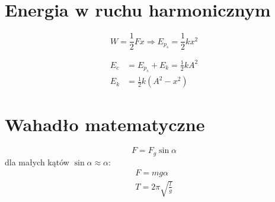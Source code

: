 \section{Energia w ruchu harmonicznym}
\begin{equation*}
  W = \frac 1 2 Fx \Rightarrow E_{p_s} = \frac 1 2 kx^2
\end{equation*}

\begin{align*}
  E_c &= E_{p_s} + E_k = \frac 1 2 kA^2\\
  E_k &= \frac 1 2 k(A^2 - x^2)
\end{align*}

\section{Wahadło matematyczne}
\begin{equation*}
  F = F_g \sin \alpha
\end{equation*}
dla małych kątów $\sin \alpha \approx \alpha$:
\begin{gather*}
  F = mg\alpha\\
  T = 2\pi\sqrt{\frac lg}
\end{gather*}

